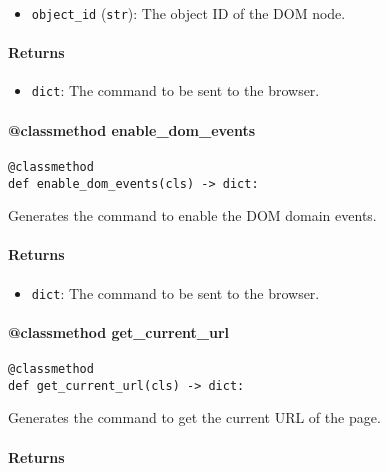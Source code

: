 \documentclass{article}
\begin{document}
\begin{itemize}
    \item \lstinline[style=pythonstyle]|object_id| (\lstinline[style=pythonstyle]|str|): The object ID of the DOM node.
\end{itemize}

\paragraph{Returns}

\begin{itemize}
    \item \lstinline[style=pythonstyle]|dict|: The command to be sent to the browser.
\end{itemize}

\paragraph{@classmethod enable\_dom\_events}

\begin{lstlisting}[style=pythonstyle]
@classmethod
def enable_dom_events(cls) -> dict:
\end{lstlisting}

\noindent Generates the command to enable the DOM domain events.

\paragraph{Returns}

\begin{itemize}
    \item \lstinline[style=pythonstyle]|dict|: The command to be sent to the browser.
\end{itemize}

\paragraph{@classmethod get\_current\_url}

\begin{lstlisting}[style=pythonstyle]
@classmethod
def get_current_url(cls) -> dict:
\end{lstlisting}

\noindent Generates the command to get the current URL of the page.

\paragraph{Returns}
\end{document}
